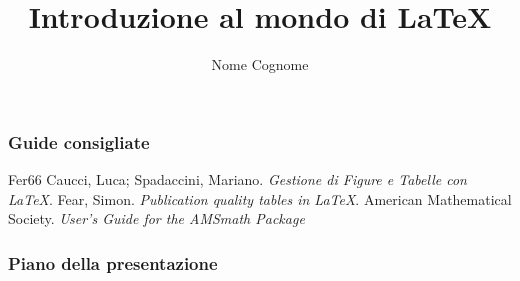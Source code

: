 \documentclass[svgnames,%
	ucs,%
	pdftex]{guitbeamer}
\title{Introduzione al mondo di \LaTeX}
\author[Nome Cognome]{Nome Cognome}
\date{} %
\begin{document}
\frame{\titlepage}
\begin{frame}
  \frametitle{Guide consigliate}
	\begin{thebibliography}{Fer66}
			Caucci, Luca; Spadaccini, Mariano.
			\newblock\textit{Gestione di Figure e Tabelle con \LaTeX}.
			Fear, Simon.
			\newblock\textit{Publication quality tables in \LaTeX}.
			American Mathematical Society.
			\newblock\textit{User's Guide for the AMSmath Package}
	\end{thebibliography}
\end{frame}
\begin{frame}
  \frametitle{Piano della presentazione}
  \tableofcontents
\end{frame}
\end{document}
